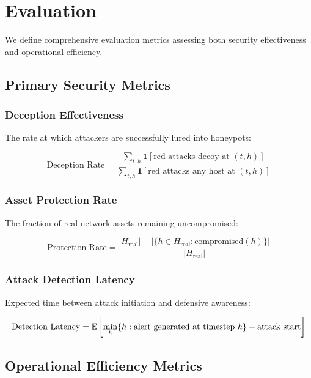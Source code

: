\documentclass[12pt,oneside,a4paper]{article}
\theoremstyle{definition}
\theoremstyle{plain}
\begin{document}
\section{Evaluation}

We define comprehensive evaluation metrics assessing both security effectiveness and operational efficiency.

\subsection{Primary Security Metrics}

\subsubsection{Deception Effectiveness}
The rate at which attackers are successfully lured into honeypots:

\begin{equation}
\text{Deception Rate} = \frac{\sum_{t,h} \mathbf{1}[\text{red attacks decoy at } (t,h)]}{\sum_{t,h} \mathbf{1}[\text{red attacks any host at } (t,h)]}
\end{equation}

\subsubsection{Asset Protection Rate}
The fraction of real network assets remaining uncompromised:

\begin{equation}
\text{Protection Rate} = \frac{|H_{\text{real}}| - |\{h \in H_{\text{real}} : \text{compromised}(h)\}|}{|H_{\text{real}}|}
\end{equation}

\subsubsection{Attack Detection Latency}
Expected time between attack initiation and defensive awareness:

\begin{equation}
\text{Detection Latency} = \mathbb{E}\left[\min_h \{h : \text{alert generated at timestep } h\} - \text{attack start}\right]
\end{equation}

\subsection{Operational Efficiency Metrics}
\end{document}
